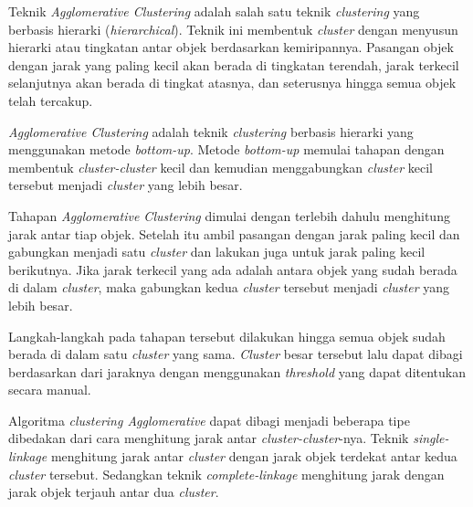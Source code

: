 Teknik \textit{Agglomerative Clustering} adalah salah satu teknik \textit{clustering} yang berbasis hierarki (\textit{hierarchical}). Teknik ini membentuk \textit{cluster} dengan menyusun hierarki atau tingkatan antar objek berdasarkan kemiripannya. Pasangan objek dengan jarak yang paling kecil akan berada di tingkatan terendah, jarak terkecil selanjutnya akan berada di tingkat atasnya, dan seterusnya hingga semua objek telah tercakup. 

\textit{Agglomerative Clustering} adalah teknik \textit{clustering} berbasis hierarki yang menggunakan metode \textit{bottom-up}. Metode \textit{bottom-up} memulai tahapan dengan membentuk \textit{cluster-cluster} kecil dan kemudian menggabungkan \textit{cluster} kecil tersebut menjadi \textit{cluster} yang lebih besar.

Tahapan \textit{Agglomerative Clustering} dimulai dengan terlebih dahulu menghitung jarak antar tiap objek. Setelah itu ambil pasangan dengan jarak paling kecil dan gabungkan menjadi satu \textit{cluster} dan lakukan juga untuk jarak paling kecil berikutnya. Jika jarak terkecil yang ada adalah antara objek yang sudah berada di dalam \textit{cluster}, maka gabungkan kedua \textit{cluster} tersebut menjadi \textit{cluster} yang lebih besar. 

Langkah-langkah pada tahapan tersebut dilakukan hingga semua objek sudah berada di dalam satu \textit{cluster} yang sama. \textit{Cluster} besar tersebut lalu dapat dibagi berdasarkan dari jaraknya dengan menggunakan \textit{threshold} yang dapat ditentukan secara manual.

Algoritma \textit{clustering Agglomerative} dapat dibagi menjadi beberapa tipe dibedakan dari cara menghitung jarak antar \textit{cluster-cluster}-nya. Teknik \textit{single-linkage} menghitung jarak antar \textit{cluster} dengan jarak objek terdekat antar kedua \textit{cluster} tersebut. Sedangkan teknik \textit{complete-linkage} menghitung jarak dengan jarak objek terjauh antar dua \textit{cluster}.

